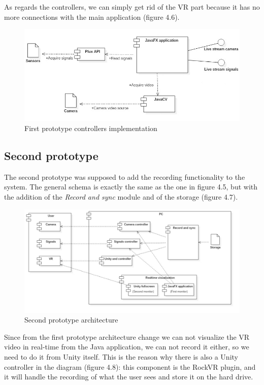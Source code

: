 \documentclass[binding=0.6cm,LaM]{sapthesis}
\begin{document}
As regards the controllers, we can simply get rid of the VR part because it has no more connections with the main application (figure 4.6).

\begin{figure}[h]
\centering
\includegraphics[scale=.51]{images/prot1_controllers_implementation2}
\caption{First prototype controllers implementation}
\end{figure}

\subsection{Second prototype}
The second prototype was supposed to add the recording functionality to the system. The general schema is exactly the same as the one in figure 4.5, but with the addition of the \textit{Record and sync} module and of the storage (figure 4.7). 

\begin{figure}[h]
\centering
\includegraphics[scale=.41]{images/prot2_general}
\caption{Second prototype architecture}
\end{figure}

Since from the first prototype architecture change we can not visualize the VR video in real-time from the Java application, we can not record it either, so we need to do it from Unity itself. This is the reason why there is also a Unity controller in the diagram (figure 4.8): this component is the RockVR plugin, and it will handle the recording of what the user sees and store it on the hard drive. 
\end{document}
